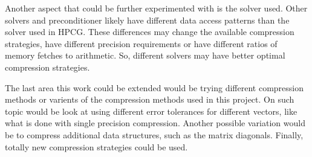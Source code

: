 Another aspect that could be further experimented with is the solver used.
Other solvers and preconditioner likely have different data access patterns than the solver used in HPCG.
These differences may change the available compression strategies, have different precision requirements or have different ratios of memory fetches to arithmetic.
So, different solvers may have better optimal compression strategies.

The last area this work could be extended would be trying different compression methods or varients of the compression methods used in this project.
On such topic would be look at using different error tolerances for different vectors, like what is done with single precision compression.
Another possible variation would be to compress additional data structures, such as the matrix diagonals.
Finally, totally new compression strategies could be used.

